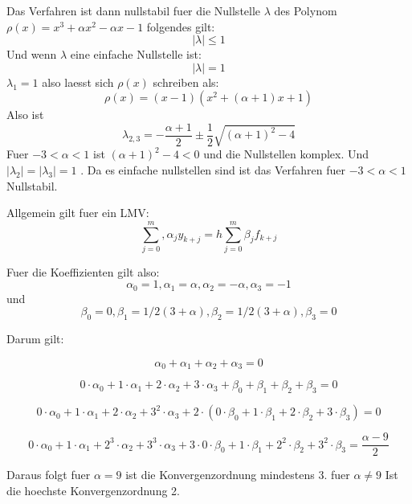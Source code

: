 \documentclass{article}
\begin{document}
Das Verfahren  ist dann nullstabil fuer die Nullstelle $\lambda$  des Polynom
$ \rho(x)= x^3 + \alpha x^2 - \alpha x -1$ folgendes gilt:
\[  | \lambda | \leq 1 \]
Und wenn $\lambda$  eine einfache Nullstelle ist:
\[  | \lambda | = 1 \]
$\lambda_1=1$ also laesst sich  $ \rho(x)$ schreiben als:
\[  \rho (x)= (x-1)(x^2+(\alpha +1)x+1) \]
Also ist 
\[   \lambda_{2,3}  = - \frac{\alpha+1}{2} \pm \frac{1}{2} 
\sqrt{(\alpha +1)^2 -4}  \]
Fuer $-3< \alpha < 1 $   ist $(\alpha +1)^2 -4 <0 $ und die Nullstellen komplex.
Und $|\lambda_2|=|\lambda_3|=1$ . Da es einfache nullstellen sind ist das Verfahren fuer
$-3< \alpha < 1 $  Nullstabil. 

Allgemein gilt fuer ein LMV:
\[
\sum_{j=0}^m ,\alpha_j y_{k+j}=h \sum_{j=0}^m \beta_j f_{k+j}
\]

Fuer die Koeffizienten gilt also:
\[ \alpha_0=1 , \alpha_1=\alpha , \alpha_2=-\alpha ,\alpha_3=-1 \]
und
\[ \beta_0=0 , \beta_1=1/2 (3+\alpha) , \beta_2=1/2 (3+\alpha),\beta_3=0 \]

Darum gilt:

\[  \alpha_0 + \alpha_1 + \alpha_2 + \alpha_3 = 0 \]

\[ 0 \cdot \alpha_0 + 1 \cdot \alpha_1 + 2 \cdot \alpha_2 + 3 \cdot \alpha_3 + \beta_0 + \beta_1 + \beta_2 + \beta_3 = 0 \]

\[ 0 \cdot \alpha_0 + 1 \cdot \alpha_1 + 2 \cdot \alpha_2 + 3^2 \cdot \alpha_3 + 2 \cdot (0 \cdot \beta_0 + 1 \cdot \beta_1 + 2 \cdot \beta_2 + 3 \cdot \beta_3 ) = 0 \]

\[ 0 \cdot \alpha_0 + 1 \cdot \alpha_1 + 2^3 \cdot \alpha_2 + 3^3 \cdot \alpha_3 + 3 \cdot 0 \cdot \beta_0 + 1 \cdot \beta_1 + 2^2 \cdot \beta_2 + 3^2 \cdot \beta_3 =  \frac{\alpha-9}{2} \]

Daraus folgt  fuer $\alpha=9$ ist die Konvergenzordnung mindestens 3. fuer $\alpha \not = 9$
Ist die hoechste Konvergenzordnung 2.
\end{document}
